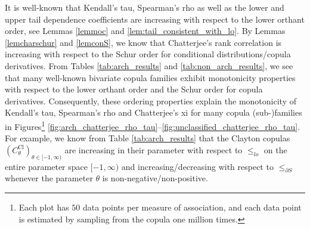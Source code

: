 \documentclass{article}
\begin{document}
It is well-known that Kendall's tau, Spearman's rho as well as the lower and upper tail dependence coefficients are increasing with respect to the lower orthant order, see Lemmas \ref{lemmoc} and \ref{lem:tail_consistent_with_lo}.
By Lemmas \ref{lemcharschur} and \ref{lemconS}, we know that Chatterjee's rank correlation is increasing with respect to the Schur order for conditional distributions/copula derivatives.
From Tables \ref{tab:arch_results} and \ref{tab:non_arch_results}, we see that many well-known bivariate copula families exhibit monotonicity properties with respect to the lower orthant order and the Schur order for copula derivatives.
Consequently, these ordering properties explain the monotonicity of Kendall's tau, Spearman's rho and Chatterjee's xi for many copula (sub-)families in Figures\footnote{Each plot has $50$ data points per measure of association, and each data point is estimated by sampling from the copula one million times.} \ref{fig:arch_chatterjee_rho_tau}--\ref{fig:unclassified_chatterjee_rho_tau}.
For example, we know from Table \ref{tab:arch_results} that the Clayton copulas \((C_{\theta}^{\text{Cl}})_{\theta\in [-1,\infty)}\) are increasing in their parameter with respect to \(\leq_{lo}\) on the entire parameter space \([-1,\infty)\) and increasing/decreasing with respect to \(\leq_{\partial S}\) whenever the parameter \(\theta\) is non-negative/non-positive.
\end{document}
